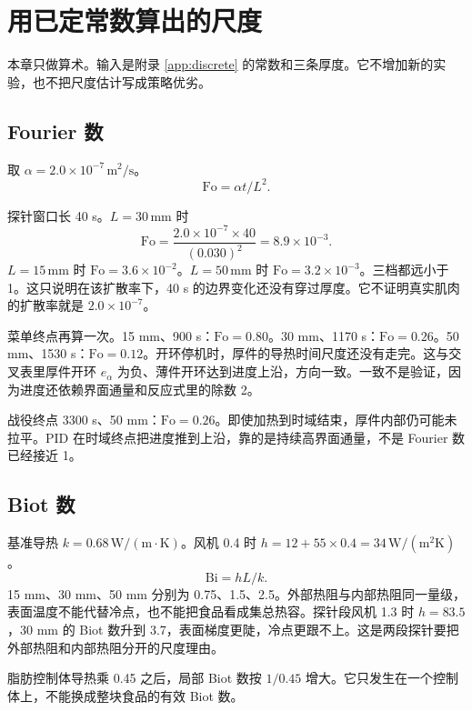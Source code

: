 \chapter{用已定常数算出的尺度}
\label{app:scales}

本章只做算术。输入是附录 \ref{app:discrete} 的常数和三条厚度。它不增加新的实验，也不把尺度估计写成策略优劣。

\section{Fourier 数}

取 \(\alpha=2.0\times 10^{-7}\,\mathrm{m}^2/\mathrm{s}\)。
\begin{equation}
\mathrm{Fo}=\alpha t/L^2.
\end{equation}

探针窗口长 40 s。\(L=30\,\mathrm{mm}\) 时
\[
\mathrm{Fo}=\frac{2.0\times 10^{-7}\times 40}{(0.030)^2}=8.9\times 10^{-3}.
\]
\(L=15\,\mathrm{mm}\) 时 \(\mathrm{Fo}=3.6\times 10^{-2}\)。\(L=50\,\mathrm{mm}\) 时 \(\mathrm{Fo}=3.2\times 10^{-3}\)。三档都远小于 1。这只说明在该扩散率下，40 s 的边界变化还没有穿过厚度。它不证明真实肌肉的扩散率就是 \(2.0\times 10^{-7}\)。

菜单终点再算一次。15 mm、900 s：\(\mathrm{Fo}=0.80\)。30 mm、1170 s：\(\mathrm{Fo}=0.26\)。50 mm、1530 s：\(\mathrm{Fo}=0.12\)。开环停机时，厚件的导热时间尺度还没有走完。这与交叉表里厚件开环 \(e_{\alpha}\) 为负、薄件开环达到进度上沿，方向一致。一致不是验证，因为进度还依赖界面通量和反应式里的除数 2。

战役终点 3300 s、50 mm：\(\mathrm{Fo}=0.26\)。即使加热到时域结束，厚件内部仍可能未拉平。PID 在时域终点把进度推到上沿，靠的是持续高界面通量，不是 Fourier 数已经接近 1。

\section{Biot 数}

基准导热 \(k=0.68\,\mathrm{W}/(\mathrm{m\cdot K})\)。风机 0.4 时 \(h=12+55\times 0.4=34\,\mathrm{W}/(\mathrm{m}^2\mathrm{K})\)。
\begin{equation}
\mathrm{Bi}=hL/k.
\end{equation}
15 mm、30 mm、50 mm 分别为 0.75、1.5、2.5。外部热阻与内部热阻同一量级，表面温度不能代替冷点，也不能把食品看成集总热容。探针段风机 1.3 时 \(h=83.5\)，30 mm 的 Biot 数升到 3.7，表面梯度更陡，冷点更跟不上。这是两段探针要把外部热阻和内部热阻分开的尺度理由。

脂肪控制体导热乘 0.45 之后，局部 Biot 数按 \(1/0.45\) 增大。它只发生在一个控制体上，不能换成整块食品的有效 Biot 数。

